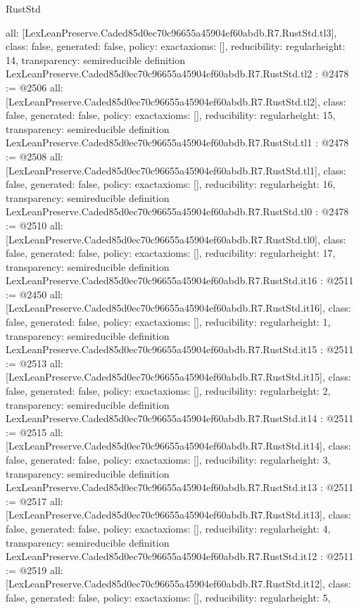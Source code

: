 \begin{lexlean}{RustStd}
\begin{coremodule}
{  all: [LexLeanPreserve.Caded85d0ec70c96655a45904ef60abdb.R7.RustStd.tl3],
  class: false,
  generated: false,
  policy: exact{axioms: []},
  reducibility: regular{height: 14},
  transparency: semireducible
}
definition LexLeanPreserve.Caded85d0ec70c96655a45904ef60abdb.R7.RustStd.tl2 : @2478 := @2506 {
  all: [LexLeanPreserve.Caded85d0ec70c96655a45904ef60abdb.R7.RustStd.tl2],
  class: false,
  generated: false,
  policy: exact{axioms: []},
  reducibility: regular{height: 15},
  transparency: semireducible
}
definition LexLeanPreserve.Caded85d0ec70c96655a45904ef60abdb.R7.RustStd.tl1 : @2478 := @2508 {
  all: [LexLeanPreserve.Caded85d0ec70c96655a45904ef60abdb.R7.RustStd.tl1],
  class: false,
  generated: false,
  policy: exact{axioms: []},
  reducibility: regular{height: 16},
  transparency: semireducible
}
definition LexLeanPreserve.Caded85d0ec70c96655a45904ef60abdb.R7.RustStd.tl0 : @2478 := @2510 {
  all: [LexLeanPreserve.Caded85d0ec70c96655a45904ef60abdb.R7.RustStd.tl0],
  class: false,
  generated: false,
  policy: exact{axioms: []},
  reducibility: regular{height: 17},
  transparency: semireducible
}
definition LexLeanPreserve.Caded85d0ec70c96655a45904ef60abdb.R7.RustStd.it16 : @2511 := @2450 {
  all: [LexLeanPreserve.Caded85d0ec70c96655a45904ef60abdb.R7.RustStd.it16],
  class: false,
  generated: false,
  policy: exact{axioms: []},
  reducibility: regular{height: 1},
  transparency: semireducible
}
definition LexLeanPreserve.Caded85d0ec70c96655a45904ef60abdb.R7.RustStd.it15 : @2511 := @2513 {
  all: [LexLeanPreserve.Caded85d0ec70c96655a45904ef60abdb.R7.RustStd.it15],
  class: false,
  generated: false,
  policy: exact{axioms: []},
  reducibility: regular{height: 2},
  transparency: semireducible
}
definition LexLeanPreserve.Caded85d0ec70c96655a45904ef60abdb.R7.RustStd.it14 : @2511 := @2515 {
  all: [LexLeanPreserve.Caded85d0ec70c96655a45904ef60abdb.R7.RustStd.it14],
  class: false,
  generated: false,
  policy: exact{axioms: []},
  reducibility: regular{height: 3},
  transparency: semireducible
}
definition LexLeanPreserve.Caded85d0ec70c96655a45904ef60abdb.R7.RustStd.it13 : @2511 := @2517 {
  all: [LexLeanPreserve.Caded85d0ec70c96655a45904ef60abdb.R7.RustStd.it13],
  class: false,
  generated: false,
  policy: exact{axioms: []},
  reducibility: regular{height: 4},
  transparency: semireducible
}
definition LexLeanPreserve.Caded85d0ec70c96655a45904ef60abdb.R7.RustStd.it12 : @2511 := @2519 {
  all: [LexLeanPreserve.Caded85d0ec70c96655a45904ef60abdb.R7.RustStd.it12],
  class: false,
  generated: false,
  policy: exact{axioms: []},
  reducibility: regular{height: 5},
}
\end{coremodule}
\end{lexlean}
